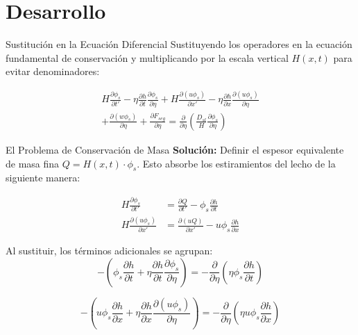 \documentclass[10pt]{beamer}
\begin{document}
\section{Desarrollo}

\begin{frame}{Sustitución en la Ecuación Diferencial}
    Sustituyendo los operadores en la ecuación fundamental de conservación y multiplicando por la escala vertical $H(x,t)$ para evitar denominadores:
    
    \begin{multline}
        H \frac{\partial \phi_s}{\partial t'} - \eta \frac{\partial h}{\partial t} \frac{\partial \phi_s}{\partial \eta} + H \frac{\partial (u \phi_s)}{\partial x'} - \eta \frac{\partial h}{\partial x} \frac{\partial (u \phi_s)}{\partial \eta} \\
        + \frac{\partial (w \phi_s)}{\partial \eta} + \frac{\partial F_{seg}}{\partial \eta} = \frac{\partial}{\partial \eta} \left( \frac{D_{sl}}{H} \frac{\partial \phi_s}{\partial \eta} \right)
    \end{multline}
\end{frame}

\begin{frame}{El Problema de Conservación de Masa}
    \textbf{Solución:} Definir el espesor equivalente de masa fina $Q = H(x,t) \cdot \phi_s$. Esto absorbe los estiramientos del lecho de la siguiente manera:
    
    \begin{align*}
        H \frac{\partial \phi_s}{\partial t'} &= \frac{\partial Q}{\partial t'} - \phi_s \frac{\partial h}{\partial t} \\
        H \frac{\partial (u \phi_s)}{\partial x'} &= \frac{\partial (u Q)}{\partial x'} - u \phi_s \frac{\partial h}{\partial x}
    \end{align*}
    
    Al sustituir, los términos adicionales se agrupan:
    \begin{equation*}
        - \left( \phi_s \frac{\partial h}{\partial t} + \eta \frac{\partial h}{\partial t} \frac{\partial \phi_s}{\partial \eta} \right) = - \frac{\partial}{\partial \eta} \left( \eta \phi_s \frac{\partial h}{\partial t} \right)
    \end{equation*}
    
    \begin{equation*}
        - \left( u \phi_s \frac{\partial h}{\partial x} + \eta \frac{\partial h}{\partial x} \frac{\partial (u \phi_s)}{\partial \eta} \right) = - \frac{\partial}{\partial \eta} \left( \eta u \phi_s \frac{\partial h}{\partial x} \right)
    \end{equation*}
\end{frame}
\end{document}

